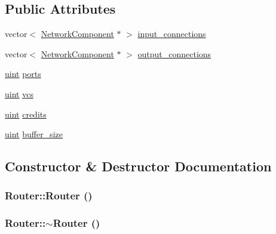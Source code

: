 \subsection*{Public Attributes}
\begin{CompactItemize}
\item 
vector$<$ \hyperlink{classNetworkComponent}{NetworkComponent} $\ast$ $>$ \hyperlink{classRouter_31d7125efdcf288bfc1627ddba9dcb15}{input\_\-connections}
\item 
vector$<$ \hyperlink{classNetworkComponent}{NetworkComponent} $\ast$ $>$ \hyperlink{classRouter_2da504d3b4c98ee90964c9367f7f0ad3}{output\_\-connections}
\item 
\hyperlink{outputBuffer_8h_91ad9478d81a7aaf2593e8d9c3d06a14}{uint} \hyperlink{classRouter_fd8e8adaf03e17b3fdbf7adc758c8f48}{ports}
\item 
\hyperlink{outputBuffer_8h_91ad9478d81a7aaf2593e8d9c3d06a14}{uint} \hyperlink{classRouter_ebaf2bc63bd99effe6520f9718120a1e}{vcs}
\item 
\hyperlink{outputBuffer_8h_91ad9478d81a7aaf2593e8d9c3d06a14}{uint} \hyperlink{classRouter_d747f5b948a9ef1497de6d4bb97b8f03}{credits}
\item 
\hyperlink{outputBuffer_8h_91ad9478d81a7aaf2593e8d9c3d06a14}{uint} \hyperlink{classRouter_b456618374083b8f2ec3c8e889d45bac}{buffer\_\-size}
\end{CompactItemize}


\subsection{Constructor \& Destructor Documentation}
\hypertarget{classRouter_555428efbf07e22776889b8d9b88027f}{
\subsubsection[{Router}]{\setlength{\rightskip}{0pt plus 5cm}Router::Router ()}}
\label{classRouter_555428efbf07e22776889b8d9b88027f}


\hypertarget{classRouter_26d13a6259937e330488653e8e16f921}{
\subsubsection[{$\sim$Router}]{\setlength{\rightskip}{0pt plus 5cm}Router::$\sim$Router ()}}
\label{classRouter_26d13a6259937e330488653e8e16f921}




